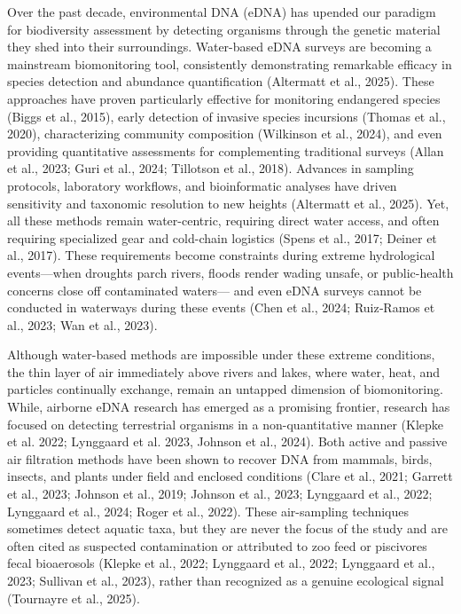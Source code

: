 \documentclass{article}
\begin{document}
Over the past decade, environmental DNA (eDNA) has upended our paradigm for biodiversity assessment by detecting organisms through the genetic material they shed into their surroundings. Water-based eDNA surveys are becoming a mainstream biomonitoring tool, consistently demonstrating remarkable efficacy in species detection and abundance quantification (Altermatt et al., 2025). These approaches have proven particularly effective for monitoring endangered species (Biggs et al., 2015), early detection of invasive species incursions (Thomas et al., 2020), characterizing community composition (Wilkinson et al., 2024), and even providing quantitative assessments for complementing traditional surveys (Allan et al., 2023; Guri et al., 2024; Tillotson et al., 2018). Advances in sampling protocols, laboratory workflows, and bioinformatic analyses have driven sensitivity and taxonomic resolution to new heights (Altermatt et al., 2025). Yet, all these methods remain water-centric, requiring direct water access, and often requiring specialized gear and cold-chain logistics (Spens et al., 2017; Deiner et al., 2017). These requirements become constraints during extreme hydrological events—when droughts parch rivers, floods render wading unsafe, or public-health concerns close off contaminated waters— and even eDNA surveys cannot be conducted in waterways during these events (Chen et al., 2024; Ruiz‐Ramos et al., 2023; Wan et al., 2023).

Although water-based methods are impossible under these extreme conditions, the thin layer of air immediately above rivers and lakes, where water, heat, and particles continually exchange, remain an untapped dimension of biomonitoring. While, airborne eDNA research has emerged as a promising frontier, research has  focused on detecting terrestrial organisms in a non-quantitative manner (Klepke et al. 2022; Lynggaard et al. 2023, Johnson et al., 2024). Both active and passive air filtration methods have been shown to recover DNA from mammals, birds, insects, and plants under field and enclosed conditions (Clare et al., 2021; Garrett et al., 2023; Johnson et al., 2019; Johnson et al., 2023; Lynggaard et al., 2022; Lynggaard et al., 2024; Roger et al., 2022). These air-sampling techniques sometimes detect aquatic taxa, but they are never the focus of the study and are often cited as suspected contamination or attributed to zoo feed or piscivores fecal bioaerosols (Klepke et al., 2022; Lynggaard et al., 2022; Lynggaard et al., 2023; Sullivan et al., 2023), rather than recognized as a genuine ecological signal (Tournayre et al., 2025). 
\end{document}
